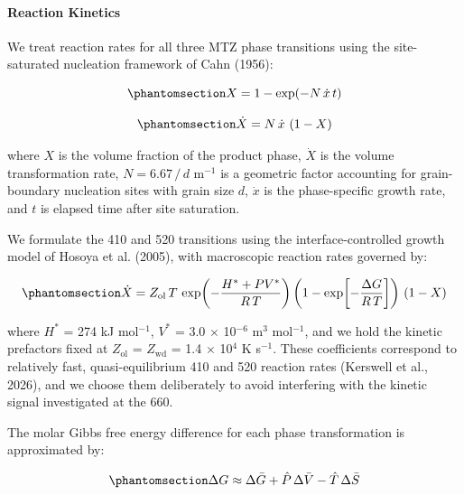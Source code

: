 \documentclass[draft,linenumbers]{agujournal2019}
\begin{document}
\paragraph{Reaction Kinetics}\label{sec:reaction-kinetics}

We treat reaction rates for all three MTZ phase transitions using the
site-saturated nucleation framework of Cahn (1956):

\begin{equation}\protect\phantomsection\label{eq:volume-fraction}{
  X = 1 - \exp\!\left(-N\, \dot{x}\, t \right)
}\end{equation}

\begin{equation}\protect\phantomsection\label{eq:volume-transformation-rate}{
  \dot{X} = N\, \dot{x}\, \left(1 - X \right)
}\end{equation}

where \(X\) is the volume fraction of the product phase, \(\dot{X}\) is
the volume transformation rate, \(N = \text{6.67}\, /\, d\) m\(^{-1}\)
is a geometric factor accounting for grain-boundary nucleation sites
with grain size \(d\), \(\dot{x}\) is the phase-specific growth rate,
and \(t\) is elapsed time after site saturation.

We formulate the 410 and 520 transitions using the interface-controlled
growth model of Hosoya et al. (2005), with macroscopic reaction rates
governed by:

\begin{equation}\protect\phantomsection\label{eq:reaction-rate-410}{
  \dot{X} = Z_\mathrm{ol}\, T\, \exp\!\left(-\frac{H^{\ast} + P V^{\ast}}{R\, T}\right) \left(1 - \exp\!\left[-\frac{\Delta G}{R\, T}\right] \right)\, \left(1 - X \right)
}\end{equation}

where \(H^{\ast}\) = 274 kJ mol\(^{-1}\), \(V^{\ast}\) = 3.0 \(\times\)
10\(^{-6}\) m\(^3\) mol\(^{-1}\), and we hold the kinetic prefactors
fixed at \(Z_\mathrm{ol}\) = \(Z_\mathrm{wd}\) = 1.4 \(\times\) 10\(^4\)
K s\(^{-1}\). These coefficients correspond to relatively fast,
quasi-equilibrium 410 and 520 reaction rates (Kerswell et al., 2026),
and we choose them deliberately to avoid interfering with the kinetic
signal investigated at the 660.

The molar Gibbs free energy difference for each phase transformation is
approximated by:

\begin{equation}\protect\phantomsection\label{eq:gibbs}{
  \Delta G \approx \Delta \bar{G} + \hat{P}\, \Delta \bar{V} - \hat{T}\, \Delta \bar{S}
}\end{equation}
\end{document}
